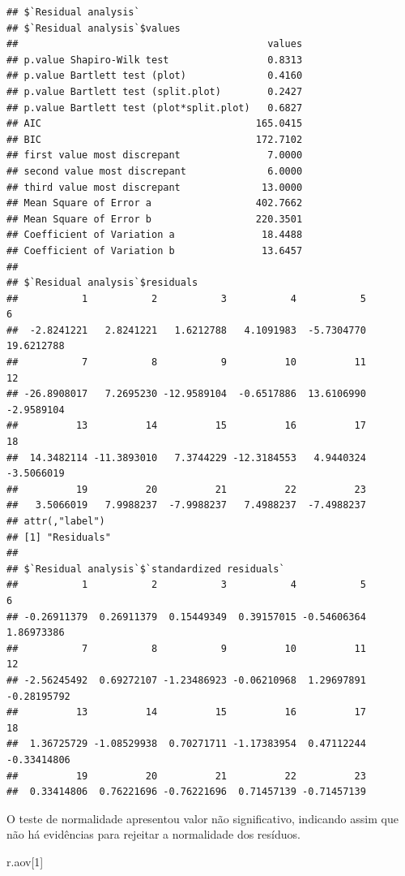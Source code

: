 \documentclass[
]{article}
\newenvironment{Shaded}{\begin{snugshade}}{\end{snugshade}}
\newcommand{\DecValTok}[1]{\textcolor[rgb]{0.00,0.00,0.81}{#1}}
\newcommand{\NormalTok}[1]{#1}
\begin{document}
\begin{verbatim}
## $`Residual analysis`
## $`Residual analysis`$values
##                                           values
## p.value Shapiro-Wilk test                 0.8313
## p.value Bartlett test (plot)              0.4160
## p.value Bartlett test (split.plot)        0.2427
## p.value Bartlett test (plot*split.plot)   0.6827
## AIC                                     165.0415
## BIC                                     172.7102
## first value most discrepant               7.0000
## second value most discrepant              6.0000
## third value most discrepant              13.0000
## Mean Square of Error a                  402.7662
## Mean Square of Error b                  220.3501
## Coefficient of Variation a               18.4488
## Coefficient of Variation b               13.6457
## 
## $`Residual analysis`$residuals
##           1           2           3           4           5           6 
##  -2.8241221   2.8241221   1.6212788   4.1091983  -5.7304770  19.6212788 
##           7           8           9          10          11          12 
## -26.8908017   7.2695230 -12.9589104  -0.6517886  13.6106990  -2.9589104 
##          13          14          15          16          17          18 
##  14.3482114 -11.3893010   7.3744229 -12.3184553   4.9440324  -3.5066019 
##          19          20          21          22          23 
##   3.5066019   7.9988237  -7.9988237   7.4988237  -7.4988237 
## attr(,"label")
## [1] "Residuals"
## 
## $`Residual analysis`$`standardized residuals`
##           1           2           3           4           5           6 
## -0.26911379  0.26911379  0.15449349  0.39157015 -0.54606364  1.86973386 
##           7           8           9          10          11          12 
## -2.56245492  0.69272107 -1.23486923 -0.06210968  1.29697891 -0.28195792 
##          13          14          15          16          17          18 
##  1.36725729 -1.08529938  0.70271711 -1.17383954  0.47112244 -0.33414806 
##          19          20          21          22          23 
##  0.33414806  0.76221696 -0.76221696  0.71457139 -0.71457139
\end{verbatim}

O teste de normalidade apresentou valor não significativo, indicando assim que não há evidências para rejeitar a normalidade dos resíduos.

\begin{Shaded}
\begin{Highlighting}[]
\NormalTok{r.aov[}\DecValTok{1}\NormalTok{]}
\end{Highlighting}
\end{Shaded}
\end{document}

